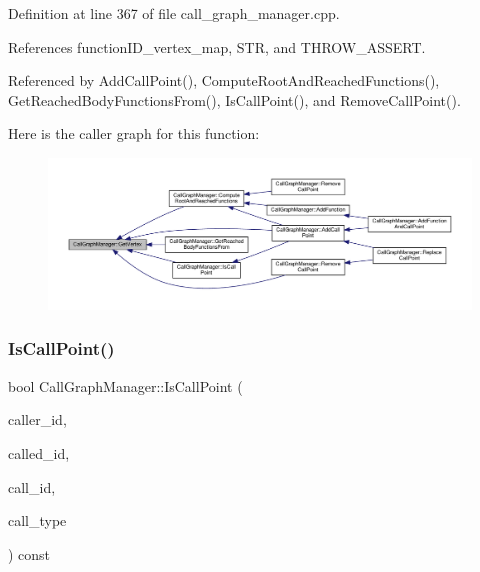 Definition at line 367 of file call\+\_\+graph\+\_\+manager.\+cpp.



References function\+I\+D\+\_\+vertex\+\_\+map, S\+TR, and T\+H\+R\+O\+W\+\_\+\+A\+S\+S\+E\+RT.



Referenced by Add\+Call\+Point(), Compute\+Root\+And\+Reached\+Functions(), Get\+Reached\+Body\+Functions\+From(), Is\+Call\+Point(), and Remove\+Call\+Point().

Here is the caller graph for this function\+:
\nopagebreak
\begin{figure}[H]
\begin{center}
\leavevmode
\includegraphics[width=350pt]{d5/d96/classCallGraphManager_a68c01aa6e40aff0aebec5ee0f503346b_icgraph}
\end{center}
\end{figure}
\mbox{\label{classCallGraphManager_a3b5428b1a496b3533bc41d9d419c5688}} 
\subsubsection{\texorpdfstring{Is\+Call\+Point()}{IsCallPoint()}}
{\footnotesize\ttfamily bool Call\+Graph\+Manager\+::\+Is\+Call\+Point (\begin{DoxyParamCaption}\item[{unsigned int}]{caller\+\_\+id,  }\item[{unsigned int}]{called\+\_\+id,  }\item[{unsigned int}]{call\+\_\+id,  }\item[{enum \hyperlink{structFunctionEdgeInfo_a39413ce8498ca68ed43c3f171f2607ef}{Function\+Edge\+Info\+::\+Call\+Type}}]{call\+\_\+type }\end{DoxyParamCaption}) const}



